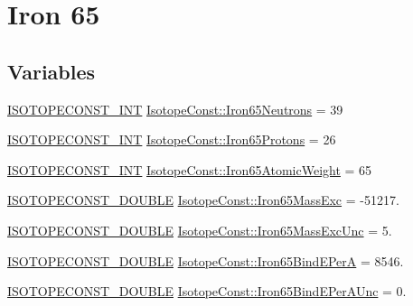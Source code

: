 \hypertarget{group___isotope_const-_iron-_fe65}{}\section{Iron 65}
\label{group___isotope_const-_iron-_fe65}
\subsection*{Variables}
\begin{DoxyCompactItemize}
\item 
\mbox{\hyperlink{group___isotope_const-_macros_ga5f18360b3e99483a35c32d789e62621c}{I\+S\+O\+T\+O\+P\+E\+C\+O\+N\+S\+T\+\_\+\+I\+NT}} \mbox{\hyperlink{group___isotope_const-_iron-_fe65_gad036cc195e1c9a774f90473e7738ec2a}{Isotope\+Const\+::\+Iron65\+Neutrons}} = 39
\item 
\mbox{\hyperlink{group___isotope_const-_macros_ga5f18360b3e99483a35c32d789e62621c}{I\+S\+O\+T\+O\+P\+E\+C\+O\+N\+S\+T\+\_\+\+I\+NT}} \mbox{\hyperlink{group___isotope_const-_iron-_fe65_gad245a0287db4bf30a0a0d534c1010e5b}{Isotope\+Const\+::\+Iron65\+Protons}} = 26
\item 
\mbox{\hyperlink{group___isotope_const-_macros_ga5f18360b3e99483a35c32d789e62621c}{I\+S\+O\+T\+O\+P\+E\+C\+O\+N\+S\+T\+\_\+\+I\+NT}} \mbox{\hyperlink{group___isotope_const-_iron-_fe65_ga71cb1d3710efea501df3c9d4f7e74904}{Isotope\+Const\+::\+Iron65\+Atomic\+Weight}} = 65
\item 
\mbox{\hyperlink{group___isotope_const-_macros_ga8f45a7272ce02c0b4c65c44636ed719a}{I\+S\+O\+T\+O\+P\+E\+C\+O\+N\+S\+T\+\_\+\+D\+O\+U\+B\+LE}} \mbox{\hyperlink{group___isotope_const-_iron-_fe65_gab7ade03552945b255319aa2c18aac531}{Isotope\+Const\+::\+Iron65\+Mass\+Exc}} = -\/51217.
\item 
\mbox{\hyperlink{group___isotope_const-_macros_ga8f45a7272ce02c0b4c65c44636ed719a}{I\+S\+O\+T\+O\+P\+E\+C\+O\+N\+S\+T\+\_\+\+D\+O\+U\+B\+LE}} \mbox{\hyperlink{group___isotope_const-_iron-_fe65_ga433e1e21e941b3355f8ce57d3cc3d229}{Isotope\+Const\+::\+Iron65\+Mass\+Exc\+Unc}} = 5.
\item 
\mbox{\hyperlink{group___isotope_const-_macros_ga8f45a7272ce02c0b4c65c44636ed719a}{I\+S\+O\+T\+O\+P\+E\+C\+O\+N\+S\+T\+\_\+\+D\+O\+U\+B\+LE}} \mbox{\hyperlink{group___isotope_const-_iron-_fe65_gad428eb93fc4ed409511fb5c90654aed7}{Isotope\+Const\+::\+Iron65\+Bind\+E\+PerA}} = 8546.
\item 
\mbox{\hyperlink{group___isotope_const-_macros_ga8f45a7272ce02c0b4c65c44636ed719a}{I\+S\+O\+T\+O\+P\+E\+C\+O\+N\+S\+T\+\_\+\+D\+O\+U\+B\+LE}} \mbox{\hyperlink{group___isotope_const-_iron-_fe65_gacec111259ba0e09052fcef4032423140}{Isotope\+Const\+::\+Iron65\+Bind\+E\+Per\+A\+Unc}} = 0.

\end{DoxyCompactItemize}
